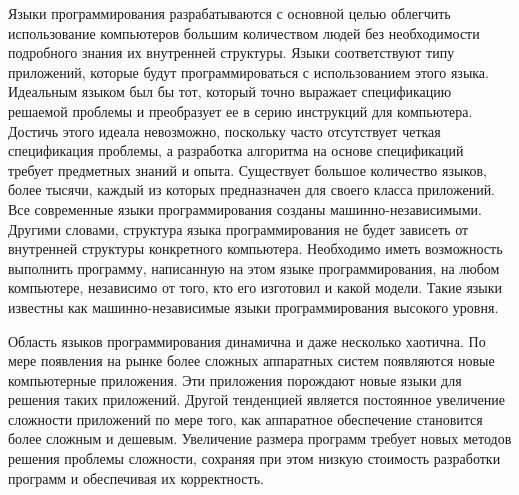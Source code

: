 \documentclass{mipt-thesis-bs}
\begin{document}
Языки программирования разрабатываются с основной целью облегчить
использование компьютеров большим количеством людей без необходимости подробного знания их
внутренней структуры. Языки соответствуют типу приложений, которые будут
программироваться с использованием этого языка. Идеальным языком был бы тот, который
точно выражает спецификацию решаемой проблемы и преобразует ее в серию инструкций для компьютера.
Достичь этого идеала невозможно, поскольку часто отсутствует четкая спецификация проблемы,
а разработка алгоритма на основе спецификаций требует предметных знаний и опыта. Существует большое
количество языков, более тысячи,
каждый из которых предназначен для своего класса приложений. Все современные языки
программирования созданы машинно-независимыми. Другими словами,
структура языка программирования не будет зависеть от внутренней структуры конкретного
компьютера. Необходимо иметь возможность выполнить программу, написанную на этом языке
программирования, на любом компьютере, независимо от того, кто его изготовил и какой
модели. Такие языки известны как машинно-независимые языки программирования высокого уровня.

Область языков программирования динамична и даже несколько хаотична. По мере появления на рынке
более сложных аппаратных систем появляются новые компьютерные приложения. Эти приложения порождают
новые языки для решения таких приложений. Другой тенденцией является постоянное увеличение сложности
приложений по мере того, как аппаратное обеспечение становится более сложным и дешевым. Увеличение
размера программ требует новых методов решения проблемы сложности, сохраняя при этом низкую стоимость
разработки программ и обеспечивая их корректность.
\end{document}
